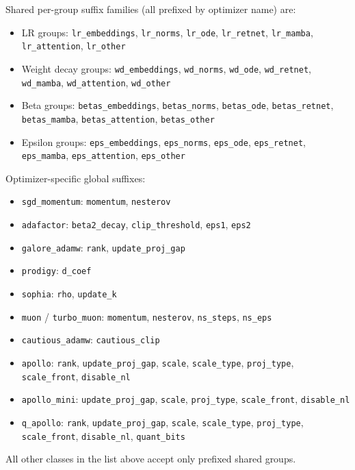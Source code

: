 Shared per-group suffix families (all prefixed by optimizer name) are:
\begin{itemize}[leftmargin=*]
    \item LR groups: \texttt{lr\_embeddings}, \texttt{lr\_norms}, \texttt{lr\_ode}, \texttt{lr\_retnet}, \texttt{lr\_mamba}, \texttt{lr\_attention}, \texttt{lr\_other}
    \item Weight decay groups: \texttt{wd\_embeddings}, \texttt{wd\_norms}, \texttt{wd\_ode}, \texttt{wd\_retnet}, \texttt{wd\_mamba}, \texttt{wd\_attention}, \texttt{wd\_other}
    \item Beta groups: \texttt{betas\_embeddings}, \texttt{betas\_norms}, \texttt{betas\_ode}, \texttt{betas\_retnet}, \texttt{betas\_mamba}, \texttt{betas\_attention}, \texttt{betas\_other}
    \item Epsilon groups: \texttt{eps\_embeddings}, \texttt{eps\_norms}, \texttt{eps\_ode}, \texttt{eps\_retnet}, \texttt{eps\_mamba}, \texttt{eps\_attention}, \texttt{eps\_other}
\end{itemize}

Optimizer-specific global suffixes:
\begin{itemize}[leftmargin=*]
    \item \texttt{sgd\_momentum}: \texttt{momentum}, \texttt{nesterov}
    \item \texttt{adafactor}: \texttt{beta2\_decay}, \texttt{clip\_threshold}, \texttt{eps1}, \texttt{eps2}
    \item \texttt{galore\_adamw}: \texttt{rank}, \texttt{update\_proj\_gap}
    \item \texttt{prodigy}: \texttt{d\_coef}
    \item \texttt{sophia}: \texttt{rho}, \texttt{update\_k}
    \item \texttt{muon} / \texttt{turbo\_muon}: \texttt{momentum}, \texttt{nesterov}, \texttt{ns\_steps}, \texttt{ns\_eps}
    \item \texttt{cautious\_adamw}: \texttt{cautious\_clip}
    \item \texttt{apollo}: \texttt{rank}, \texttt{update\_proj\_gap}, \texttt{scale}, \texttt{scale\_type}, \texttt{proj\_type}, \texttt{scale\_front}, \texttt{disable\_nl}
    \item \texttt{apollo\_mini}: \texttt{update\_proj\_gap}, \texttt{scale}, \texttt{proj\_type}, \texttt{scale\_front}, \texttt{disable\_nl}
    \item \texttt{q\_apollo}: \texttt{rank}, \texttt{update\_proj\_gap}, \texttt{scale}, \texttt{scale\_type}, \texttt{proj\_type}, \texttt{scale\_front}, \texttt{disable\_nl}, \texttt{quant\_bits}
\end{itemize}
All other classes in the list above accept only prefixed shared groups.

